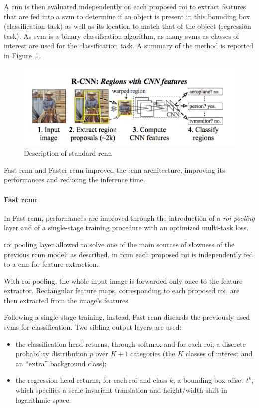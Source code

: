 \documentclass[%
    corpo=12pt,
    twoside,
    stile=classica,   
    tipotesi=magistrale,
    evenboxes,
    english,
	numerazioneromana,
]{toptesi}
\newcommand{\quotes}[1]{``#1''}
\begin{document}
A \gls{cnn} is then evaluated independently on each proposed \gls{roi} to extract features that are fed into a \gls{svm}
to determine if an object is present in this bounding box (classification task) as well as its location to match that of the object (regression task). As \gls{svm} is a binary classification algorithm, as many \glspl{svm} as classes of interest are used for the classification task. A summary of the method is reported in Figure~\ref{fig:rcnn}.

\begin{figure}[ht]
	\centering
	\includegraphics[width=.8\linewidth]{imgs/rcnn.png}
	\caption{Description of standard \gls{rcnn}\cite{girshick2014rich}}
	\label{fig:rcnn}
\end{figure}

\medskip
Fast \gls{rcnn}\cite{girshick2015fast} and Faster \gls{rcnn}\cite{ren2016faster} improved the \gls{rcnn} architecture, improving its performances and reducing the inference time.

\paragraph{Fast \gls{rcnn}}
In Fast \gls{rcnn}\cite{girshick2015fast}, performances are improved through the introduction of a \textit{\gls{roi} pooling} layer and of a single-stage training procedure with an optimized multi-task loss.

\medskip
\Gls{roi} pooling layer allowed to solve one of the main sources of slowness of the previous \gls{rcnn} model: as described, in \gls{rcnn} each proposed \gls{roi} is independently fed to a \gls{cnn} for feature extraction.

With \gls{roi} pooling, the whole input image is forwarded only once to the feature extractor. Rectangular feature maps, corresponding to each proposed \gls{roi}, are then extracted from the image's features.

\medskip
Following a single-stage training, instead, Fast \gls{rcnn} discards the previously used \glspl{svm} for classification. Two sibling output layers are used:
\begin{itemize}
	\item the classification head returns, through softmax and for each \gls{roi}, a discrete probability distribution $p$ over $K+1$ categories (the $K$ classes of interest and an \quotes{extra} background class);
	\item the regression head returns, for each \gls{roi} and class $k$, a bounding box offset $t^k$, which specifies a scale invariant translation and height/width shift in logarithmic space.
\end{itemize}
\end{document}
